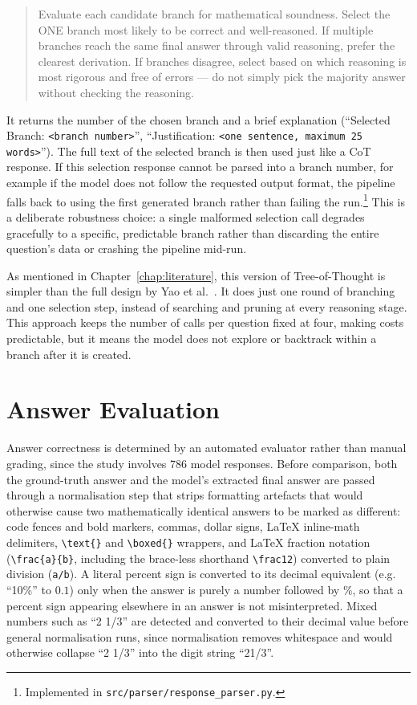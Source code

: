 \begin{quote}
\ttfamily\small
Evaluate each candidate branch for mathematical soundness. Select the
ONE branch most likely to be correct and well-reasoned. If multiple
branches reach the same final answer through valid reasoning, prefer
the clearest derivation. If branches disagree, select based on which
reasoning is most rigorous and free of errors --- do not simply pick
the majority answer without checking the reasoning.
\end{quote}

It returns the number of the chosen branch and a brief explanation
(``Selected Branch: \texttt{<branch number>}'', ``Justification:
\texttt{<one sentence, maximum 25 words>}''). The full text of the
selected branch is then used just like a CoT response. If this selection
response cannot be parsed into a branch number, for example if the model
does not follow the requested output format, the pipeline falls back to
using the first generated branch rather than failing the
run.\footnote{Implemented in \texttt{src/parser/response\_parser.py}.}
This is a deliberate robustness choice: a single malformed selection
call degrades gracefully to a specific, predictable branch rather than
discarding the entire question's data or crashing the pipeline mid-run.

As mentioned in Chapter~\ref{chap:literature}, this version of
Tree-of-Thought is simpler than the full design by Yao et
al.~\cite{yao2023tree}. It does
just one round of branching and one selection step, instead of searching
and pruning at every reasoning stage. This approach keeps the number of
calls per question fixed at four, making costs predictable, but it means
the model does not explore or backtrack within a branch after it is
created.

\section{Answer Evaluation}
\label{sec:answer-eval}

Answer correctness is determined by an automated evaluator rather than
manual grading, since the study involves 786 model responses. Before
comparison, both the ground-truth answer and the model's extracted final
answer are passed through a normalisation step that strips formatting
artefacts that would otherwise cause two mathematically identical answers
to be marked as different: code fences and bold markers, commas, dollar
signs, LaTeX inline-math delimiters, \texttt{\textbackslash text\{\}} and
\texttt{\textbackslash boxed\{\}} wrappers, and LaTeX fraction notation
(\texttt{\textbackslash frac\{a\}\{b\}}, including the brace-less
shorthand \texttt{\textbackslash frac12}) converted to plain division
(\texttt{a/b}). A literal percent sign is converted to its decimal
equivalent (e.g. ``10\%'' to $0.1$) only when the answer is purely a
number followed by \%, so that a percent sign appearing elsewhere in an
answer is not misinterpreted. Mixed numbers such as ``2 1/3'' are detected
and converted to their decimal value before general normalisation runs,
since normalisation removes whitespace and would otherwise collapse
``2 1/3'' into the digit string ``21/3''.

